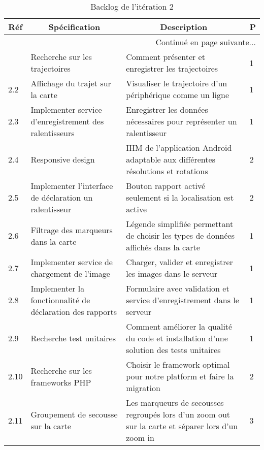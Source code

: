 \begin{center}
    \footnotesize
    \begin{longtable}{| p{1cm} | p{5cm} | p{7cm} | l |}
        \caption{Backlog de l'itération 2}
\label{tab:sprint2-backlog} \\

        \hline
        \multicolumn{1}{|c}{\textbf{Réf}} &
        \multicolumn{1}{|c}{\textbf{Spécification}} &
        \multicolumn{1}{|c}{\textbf{Description}} &
        \multicolumn{1}{|c|}{\textbf{P}} \\ \hline
        \endhead

        \hline \multicolumn{4}{|r|}{{Continué en page suivante$\dotsc$}} \\ \hline
        \endfoot

        \hline \hline
        \endlastfoot

        \hline
2.1 & Recherche sur les trajectoires & Comment présenter et enregistrer les trajectoires & 1 \\ \hline
2.2 & Affichage du trajet sur la carte & Visualiser le trajectoire d'un périphérique comme un ligne & 1 \\ \hline
2.3 & Implementer service d'enregistrement des ralentisseurs & Enregistrer les données nécessaires pour représenter un ralentisseur & 1 \\ \hline
2.4 & Responsive design & IHM de l'application Android adaptable aux différentes résolutions et rotations & 2 \\ \hline
2.5 & Implementer l'interface de déclaration un ralentisseur & Bouton rapport activé seulement si la localisation est active & 2 \\ \hline
2.6 & Filtrage des marqueurs dans la carte & Légende simplifiée permettant de choisir les types de données affichés dans la carte & 1 \\ \hline
2.7 & Implementer service de chargement de l'image & Charger, valider et enregistrer les images dans le serveur & 1 \\ \hline
2.8 & Implementer la fonctionnalité de déclaration des rapports & Formulaire avec validation et service d'enregistrement dans le serveur & 1 \\ \hline
2.9 & Recherche test unitaires & Comment améliorer la qualité du code et installation d'une solution des tests unitaires & 1 \\ \hline
2.10 & Recherche sur les frameworks PHP & Choisir le framework optimal pour notre platform et faire la migration & 2 \\ \hline
2.11 & Groupement de secousse sur la carte & Les marqueurs de secousses regroupés lors d'un zoom out sur la carte et séparer lors d'un zoom in & 3 \\ \hline
    \end{longtable}
\end{center}

